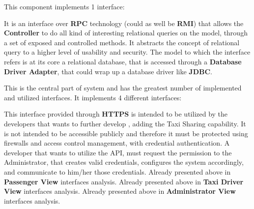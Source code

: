 \begin{itemize}
\begin{itemize}
	\end{itemize}
	This component implements 1 interface:
	\begin{itemize}
		 It is an interface over \textbf{RPC} technology (could as well be \textbf{RMI}) that allows the \textbf{Controller} to do all kind of interesting relational queries on the \myTaxiService{} model, through a set of exposed and controlled methods.
		It abstracts the concept of relational query to a higher level of usability and security.
		The model to which the interface refers is at its core a relational database, that is accessed through a \textbf{Database Driver Adapter}, that could wrap up a database driver like \textbf{JDBC}.
	\end{itemize}
	\itemBold{Controller}
	This is the central part of \myTaxiService{} system and has the greatest number of implemented and utilized interfaces.
	It implements 4 different interfaces:
	\begin{itemize}
		 This interface provided through \textbf{HTTPS} is intended to be utilized by the developers that wants to further develop \myTaxiService{}, adding the Taxi Sharing capability.
		It is not intended to be accessible publicly and therefore it must be protected using firewalls and access control management, with credential authentication.
		A developer that wants to utilize the API, must request the permission to the Administrator, that creates valid credentials, configures the system accordingly, and communicate to him/her those credentials.
		 Already presented above in \textbf{Passenger View} interfaces analysis.
		 Already presented above in \textbf{Taxi Driver View} interfaces analysis.
		 Already presented above in \textbf{Administrator View} interfaces analysis.
	\end{itemize}
\end{itemize}

